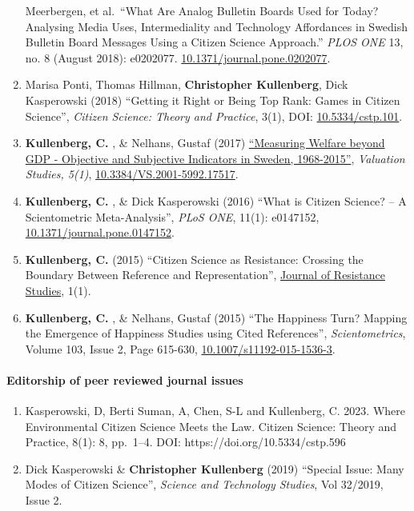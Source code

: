 \documentclass[
]{article}
\providecommand{\tightlist}{%
  \setlength{\itemsep}{0pt}\setlength{\parskip}{0pt}}
\begin{document}
\begin{enumerate}
  Meerbergen, et al.~``What Are Analog Bulletin Boards Used for Today?
  Analysing Media Uses, Intermediality and Technology Affordances in
  Swedish Bulletin Board Messages Using a Citizen Science Approach.''
  \emph{PLOS ONE} 13, no. 8 (August 2018): e0202077.
  \href{https://doi.org/10.1371/journal.pone.0202077}{10.1371/journal.pone.0202077}.
\item
  Marisa Ponti, Thomas Hillman, \textbf{Christopher Kullenberg}, Dick
  Kasperowski (2018) ``Getting it Right or Being Top Rank: Games in
  Citizen Science'', \emph{Citizen Science: Theory and Practice}, 3(1),
  DOI: \href{http://doi.org/10.5334/cstp.101}{10.5334/cstp.101}.
\item
  \textbf{Kullenberg, C.} , \& Nelhans, Gustaf (2017)
  \href{https://dx.doi.org/10.3384/VS.2001-5992.17517}{``Measuring
  Welfare beyond GDP - Objective and Subjective Indicators in Sweden,
  1968-2015''}, \emph{Valuation Studies, 5(1)},
  \href{https://dx.doi.org/10.3384/VS.2001-5992.17517}{10.3384/VS.2001-5992.17517}.
\item
  \textbf{Kullenberg, C.} , \& Dick Kasperowski (2016) ``What is Citizen
  Science? -- A Scientometric Meta-Analysis'', \emph{PLoS ONE}, 11(1):
  e0147152,
  \href{http://dx.doi.org/10.1371/journal.pone.0147152}{10.1371/journal.pone.0147152}.
\item
  \textbf{Kullenberg, C.} (2015) ``Citizen Science as Resistance:
  Crossing the Boundary Between Reference and Representation'',
  \href{https://gup.ub.gu.se/publication/218601-citizen-science-as-resistance-crossing-the-boundary-between-reference-and-representation}{Journal
  of Resistance Studies}, 1(1).
\item
  \textbf{Kullenberg, C.} , \& Nelhans, Gustaf (2015) ``The Happiness
  Turn? Mapping the Emergence of Happiness Studies using Cited
  References'', \emph{Scientometrics}, Volume 103, Issue 2, Page
  615-630,
  \href{http://dx.doi.org/10.1007/s11192-015-1536-3}{10.1007/s11192-015-1536-3}.
\end{enumerate}

\hypertarget{editorship-of-peer-reviewed-journal-issues}{%
\paragraph{Editorship of peer reviewed journal
issues}\label{editorship-of-peer-reviewed-journal-issues}}

\begin{enumerate}
\def\labelenumi{\arabic{enumi}.}
\tightlist
\item
  Kasperowski, D, Berti Suman, A, Chen, S-L and Kullenberg, C. 2023.
  Where Environmental Citizen Science Meets the Law. Citizen Science:
  Theory and Practice, 8(1): 8, pp.~1--4. DOI:
  https://doi.org/10.5334/cstp.596
\item
  Dick Kasperowski \& \textbf{Christopher Kullenberg} (2019) ``Special
  Issue: Many Modes of Citizen Science'', \emph{Science and Technology
  Studies}, Vol 32/2019, Issue 2.
\end{enumerate}
\end{document}
